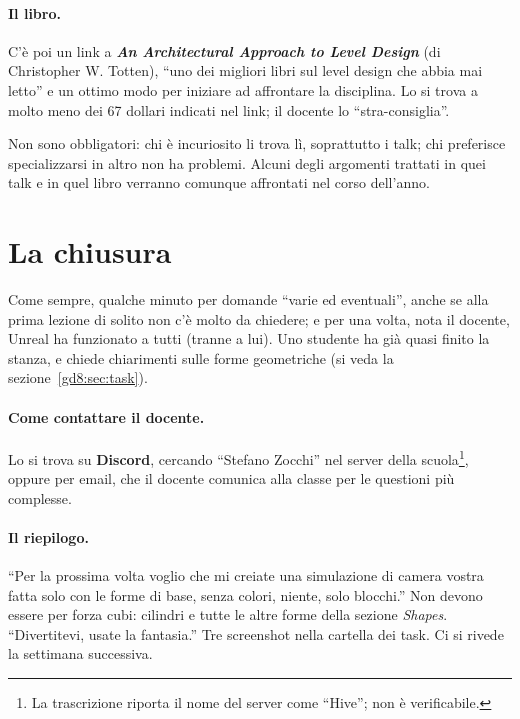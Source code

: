 \paragraph{Il libro.} C'è poi un link a \textbf{\emph{An Architectural
Approach to Level Design}} (di Christopher W. Totten), ``uno dei migliori libri
sul level design che abbia mai letto'' e un ottimo modo per iniziare ad
affrontare la disciplina. Lo si trova a molto meno dei 67 dollari indicati nel
link; il docente lo ``stra-consiglia''.

Non sono obbligatori: chi è incuriosito li trova lì, soprattutto i talk; chi
preferisce specializzarsi in altro non ha problemi. Alcuni degli argomenti
trattati in quei talk e in quel libro verranno comunque affrontati nel corso
dell'anno.

\section{La chiusura}
\label{gd8:sec:chiusura}

Come sempre, qualche minuto per domande ``varie ed eventuali'', anche se alla
prima lezione di solito non c'è molto da chiedere; e per una volta, nota il
docente, Unreal ha funzionato a tutti (tranne a lui). Uno studente ha già
quasi finito la stanza, e chiede chiarimenti sulle forme geometriche (si veda
la sezione~\ref{gd8:sec:task}).

\paragraph{Come contattare il docente.} Lo si trova su \textbf{Discord},
cercando ``Stefano Zocchi'' nel server della scuola\footnote{La trascrizione
riporta il nome del server come ``Hive''; non è verificabile.}, oppure per
email, che il docente comunica alla classe per le questioni più complesse.

\paragraph{Il riepilogo.} ``Per la prossima volta voglio che mi creiate una
simulazione di camera vostra fatta solo con le forme di base, senza colori,
niente, solo blocchi.'' Non devono essere per forza cubi: cilindri e tutte le
altre forme della sezione \emph{Shapes}. ``Divertitevi, usate la fantasia.''
Tre screenshot nella cartella dei task. Ci si rivede la settimana successiva.


